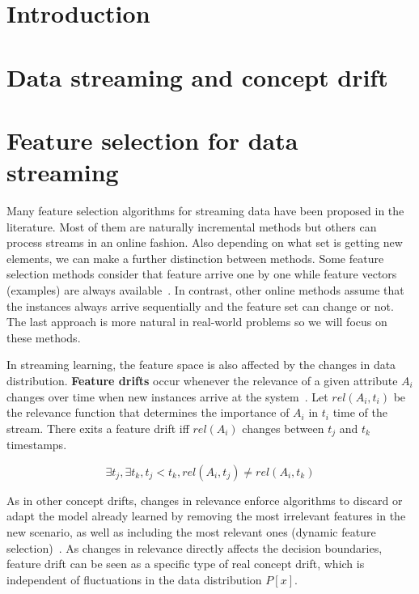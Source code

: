 \documentclass[preprint,12pt]{elsarticle}
\begin{document}

\section{Introduction}
\label{sec:intro}



\section{Data streaming and concept drift}


\section{Feature selection for data streaming}
\label{sec:fs}

Many feature selection algorithms for streaming data have been proposed in the literature. Most of them are naturally incremental methods but others can process streams in an online fashion. Also depending on what set is getting new elements, we can make a further distinction between methods. Some feature selection methods consider that feature arrive one by one while feature vectors (examples) are always available~\citep{wu10, eskandari16}. In contrast, other online methods assume that the instances always arrive sequentially and the feature set can change or not. The last approach is more natural in real-world problems so we will focus on these methods. 

In streaming learning, the feature space is also affected by the changes in data distribution. \textbf{Feature drifts} occur whenever the relevance of a given attribute $A_i$ changes over time when new instances arrive at the system~\cite{barddal15}. Let $rel(A_i, t_i)$ be the relevance function that determines the importance of $A_i$ in $t_i$ time of the stream. There exits a feature drift iff $rel(A_i)$ changes between $t_j$ and $t_k$ timestamps.

\begin{equation}\label{eq:rel}
\exists t_j, \exists t_k, t_j < t_k, rel(A_i, t_j) \neq rel(A_i, t_k)
\end{equation}

As in other concept drifts, changes in relevance enforce algorithms to discard or adapt the model already learned by removing the most irrelevant features in the new scenario, as well as including the most relevant ones (dynamic feature selection)~\cite{nguyen12}. As changes in relevance directly affects the decision boundaries, feature drift can be seen as a specific type of real concept drift, which is independent of fluctuations in the data distribution $P[x]$. 
\end{document}
